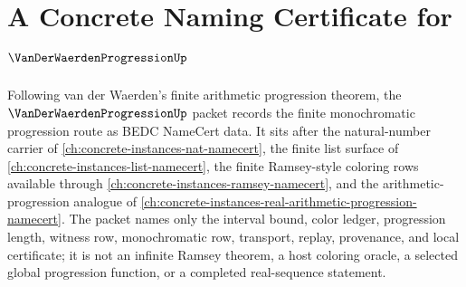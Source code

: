 \chapter{A Concrete Naming Certificate for $\VanDerWaerdenProgressionUp$}
\label{ch:concrete-instances-van-der-waerden-progression-namecert}

Following van der Waerden's finite arithmetic progression theorem, the $\VanDerWaerdenProgressionUp$ packet records the finite monochromatic progression route as BEDC NameCert data. It sits after the natural-number carrier of \autoref{ch:concrete-instances-nat-namecert}, the finite list surface of \autoref{ch:concrete-instances-list-namecert}, the finite Ramsey-style coloring rows available through \autoref{ch:concrete-instances-ramsey-namecert}, and the arithmetic-progression analogue of \autoref{ch:concrete-instances-real-arithmetic-progression-namecert}. The packet names only the interval bound, color ledger, progression length, witness row, monochromatic row, transport, replay, provenance, and local certificate; it is not an infinite Ramsey theorem, a host coloring oracle, a selected global progression function, or a completed real-sequence statement.

